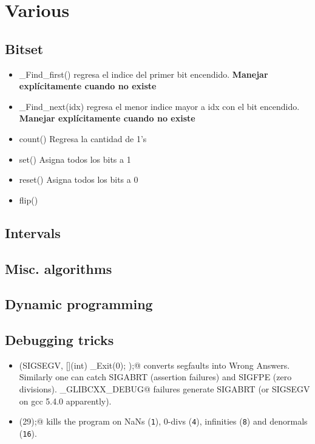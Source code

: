 \chapter{Various}

\section{Bitset}

\begin{itemize}
    \item \_Find\_first() regresa el indice del primer bit encendido. \textbf{Manejar explícitamente cuando no existe}
    \item \_Find\_next(idx) regresa el menor indice mayor a idx con el bit encendido. \textbf{Manejar explícitamente cuando no existe}
    \item count() Regresa la cantidad de 1's
    \item set() Asigna todos los bits a 1
    \item reset() Asigna todos los bits a 0
    \item flip()
\end{itemize}

\section{Intervals}

\section{Misc. algorithms}

\section{Dynamic programming}

\section{Debugging tricks}
	\begin{itemize}
		\item \verb@signal(SIGSEGV, [](int) { _Exit(0); });@ converts segfaults into Wrong Answers.
			Similarly one can catch SIGABRT (assertion failures) and SIGFPE (zero divisions).
			\verb@_GLIBCXX_DEBUG@ failures generate SIGABRT (or SIGSEGV on gcc 5.4.0 apparently).
		\item \verb@feenableexcept(29);@ kills the program on NaNs (\texttt 1), 0-divs (\texttt 4), infinities (\texttt 8) and denormals (\texttt{16}).
	\end{itemize}

